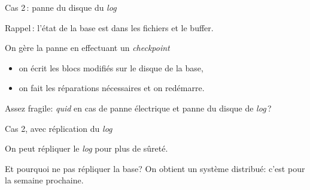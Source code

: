 \begin{frame}{Cas 2\,: panne du disque du \textit{log}}

Rappel\,: l'état de la base est dans les fichiers \alert{et} le buffer.

\vfill

On gère la panne en effectuant un \textit{checkpoint}

\begin{itemize}
  \item on écrit les blocs modifiés sur le disque de la base,
        \item on fait les réparations nécessaires et on redémarre.
\end{itemize}

\vfill

\begin{block}{}
Assez fragile: \textit{quid} en cas de panne électrique
\alert{et} panne du disque de \textit{log}\,?
\end{block}

\end{frame}


\begin{frame}{Cas 2, avec réplication du \textit{log}}

On peut répliquer le \textit{log} pour plus de sûreté.

\vfill


\vfill

\begin{block}{}
Et pourquoi ne pas répliquer la base? On obtient un \alert{système
distribué}: c'est pour la semaine prochaine.
\end{block}

\end{frame}


